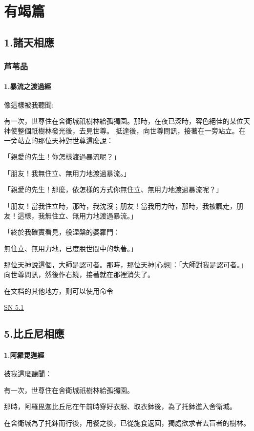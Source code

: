 \documentclass[a4paper,12pt,oneside]{book}
\newcommand{\mycite}[1]{\textsuperscript{\cite{#1}}}
\begin{document}
\part{有竭篇}
\chapter{1.諸天相應}
\section{芦苇品}


\subsection{1.暴流之渡過經}


像這樣被我聽聞:\mycite{g1}

有一次，世尊住在舍衛城祇樹林給孤獨園。那時，在夜已深時，容色絕佳的某位天神使整個祇樹林發光後，去見世尊。
抵達後，向世尊問訊，接著在一旁站立。在一旁站立的那位天神對世尊這麼說：

「親愛的先生！你怎樣渡過暴流呢？」

「朋友！我無住立、無用力地渡過暴流。」

「親愛的先生！那麼，依怎樣的方式你無住立、無用力地渡過暴流呢？」

「朋友！當我住立時，那時，我沈沒；朋友！當我用力時，那時，我被飄走，朋友！這樣，我無住立、無用力地渡過暴流。」

「終於我確實看見，般涅槃的婆羅門：

無住立、無用力地，已度脫世間中的執著。」

那位天神說這個，大師是認可者。那時，那位天神[心想]：「大師對我是認可者。」向世尊問訊，然後作右繞，接著就在那裡消失了。



在文档的其他地方，则可以使用命令

\hyperref[subsec:5.1ss]{SN 5.1}


\chapter{5.比丘尼相應}

\subsection{1.阿羅毘迦經}
\label{subsec:5.1ss}

被我這麼聽聞：

有一次，世尊住在舍衛城祇樹林給孤獨園。

那時，阿羅毘迦比丘尼在午前時穿好衣服、取衣鉢後，為了托鉢進入舍衛城。

在舍衛城為了托鉢而行後，用餐之後，已從施食返回，獨處欲求者去盲者的樹林。

\clearpage

\printbibliography[heading=bibliography,title=注释]
\end{document}
